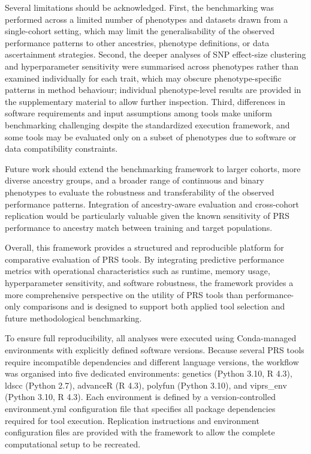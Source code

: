 \documentclass[pdflatex,sn-basic]{sn-jnl}
\begin{document}
Several limitations should be acknowledged. First, the benchmarking was performed across a limited number of phenotypes and datasets drawn from a single-cohort setting, which may limit the generalisability of the observed performance patterns to other ancestries, phenotype definitions, or data ascertainment strategies. Second, the deeper analyses of SNP effect-size clustering and hyperparameter sensitivity were summarised across phenotypes rather than examined individually for each trait, which may obscure phenotype-specific patterns in method behaviour; individual phenotype-level results are provided in the supplementary material to allow further inspection. Third, differences in software requirements and input assumptions among tools make uniform benchmarking challenging despite the standardized execution framework, and some tools may be evaluated only on a subset of phenotypes due to software or data compatibility constraints.

Future work should extend the benchmarking framework to larger cohorts, more diverse ancestry groups, and a broader range of continuous and binary phenotypes to evaluate the robustness and transferability of the observed performance patterns. Integration of ancestry-aware evaluation and cross-cohort replication would be particularly valuable given the known sensitivity of PRS performance to ancestry match between training and target populations.

Overall, this framework provides a structured and reproducible platform for comparative evaluation of PRS tools. By integrating predictive performance metrics with operational characteristics such as runtime, memory usage, hyperparameter sensitivity, and software robustness, the framework provides a more comprehensive perspective on the utility of PRS tools than performance-only comparisons and is designed to support both applied tool selection and future methodological benchmarking.

To ensure full reproducibility, all analyses were executed using Conda-managed environments with explicitly defined software versions. Because several PRS tools require incompatible dependencies and different language versions, the workflow was organised into five dedicated environments: genetics (Python 3.10, R 4.3), ldscc (Python 2.7), advanceR (R 4.3), polyfun (Python 3.10), and viprs\_env (Python 3.10, R 4.3). Each environment is defined by a version-controlled environment.yml configuration file that specifies all package dependencies required for tool execution. Replication instructions and environment configuration files are provided with the framework to allow the complete computational setup to be recreated.
\end{document}
